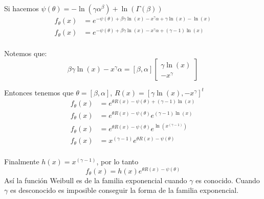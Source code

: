 \documentclass[12pt,]{article}
\begin{document}
Si hacemos
\(\psi(\theta)= -\ln(\gamma \alpha^\beta) +\ln(\Gamma(\beta))\) \[
\begin{array}{rl}
f_\theta(x) & = e^{-\psi(\theta)+\beta\gamma\ln(x)-x^\gamma\alpha+\gamma\ln(x)-\ln(x)} \\
f_\theta(x) & = e^{-\psi(\theta)+\beta\gamma\ln(x)-x^\gamma\alpha+(\gamma-1)\ln(x)} \\
\end{array}
\]

Notemos que:
\[\beta\gamma\ln(x)-x^\gamma\alpha=[\beta, \alpha]\begin{bmatrix} \gamma\ln(x) \\ -x^\gamma \end{bmatrix}\]

Entonces tenemos que \(\theta=[\beta, \alpha]\),
\(R(x)=[\gamma\ln(x), -x^\gamma]^t\) \[
\begin{array}{rl}
f_\theta(x) & = e^{\theta R(x)-\psi(\theta)+(\gamma-1)\ln(x)} \\
f_\theta(x) & = e^{\theta R(x)-\psi(\theta)}e^{(\gamma-1)\ln(x)} \\
f_\theta(x) & = e^{\theta R(x)-\psi(\theta)}e^{\ln(x^{(\gamma-1)})} \\
f_\theta(x) & = x^{(\gamma-1)} e^{\theta R(x)-\psi(\theta)}\\
\end{array}
\]

Finalmente \(h(x)=x^{(\gamma-1)}\), por lo tanto
\[f_\theta(x) = h(x) e^{\theta R(x)-\psi(\theta)}\] Así la función
Weibull es de la familia exponencial cuando \(\gamma\) es conocido.
Cuando \(\gamma\) es desconocido es imposible conseguir la forma de la
familia exponencial.
\end{document}
